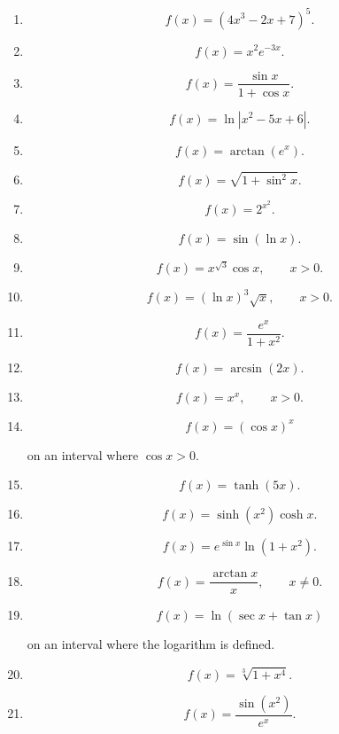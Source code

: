 \begin{enumerate}
\item
\[
f(x)=(4x^3-2x+7)^5.
\]

\item
\[
f(x)=x^2e^{-3x}.
\]

\item
\[
f(x)=\frac{\sin x}{1+\cos x}.
\]

\item
\[
f(x)=\ln|x^2-5x+6|.
\]

\item
\[
f(x)=\arctan(e^x).
\]

\item
\[
f(x)=\sqrt{1+\sin^2x}.
\]

\item
\[
f(x)=2^{x^2}.
\]

\item
\[
f(x)=\sin(\ln x).
\]

\item
\[
f(x)=x^{\sqrt3}\cos x,
\qquad x>0.
\]

\item
\[
f(x)=(\ln x)^3\sqrt{x},
\qquad x>0.
\]

\item
\[
f(x)=\frac{e^x}{1+x^2}.
\]

\item
\[
f(x)=\arcsin(2x).
\]

\item
\[
f(x)=x^x,
\qquad x>0.
\]

\item
\[
f(x)=(\cos x)^x
\]

on an interval where \(\cos x>0\).

\item
\[
f(x)=\tanh(5x).
\]

\item
\[
f(x)=\sinh(x^2)\cosh x.
\]

\item
\[
f(x)=e^{\sin x}\ln(1+x^2).
\]

\item
\[
f(x)=\frac{\arctan x}{x},
\qquad x\neq0.
\]

\item
\[
f(x)=\ln(\sec x+\tan x)
\]

on an interval where the logarithm is defined.

\item
\[
f(x)=\sqrt[3]{1+x^4}.
\]

\item
\[
f(x)=\frac{\sin(x^2)}{e^x}.
\]


\end{enumerate}
